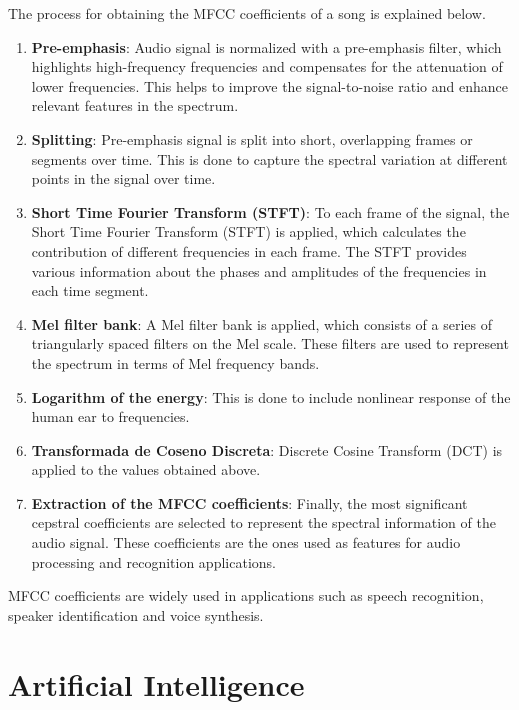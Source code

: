 The process for obtaining the MFCC coefficients of a song is explained below.

\begin{enumerate}
\item \textbf{Pre-emphasis}: Audio signal is normalized with a pre-emphasis filter, which highlights high-frequency frequencies and compensates for the attenuation of lower frequencies. This helps to improve the signal-to-noise ratio and enhance relevant features in the spectrum.

\item \textbf{Splitting}: Pre-emphasis signal is split into short, overlapping frames or segments over time. This is done to capture the spectral variation at different points in the signal over time.

\item \textbf{Short Time Fourier Transform (STFT)}: To each frame of the signal, the Short Time Fourier Transform (STFT) is applied, which calculates the contribution of different frequencies in each frame. The STFT provides various information about the phases and amplitudes of the frequencies in each time segment.

\item \textbf{Mel filter bank}: A Mel filter bank is applied, which consists of a series of triangularly spaced filters on the Mel scale. These filters are used to represent the spectrum in terms of Mel frequency bands.

\item \textbf{Logarithm of the energy}: This is done to include nonlinear response of the human ear to frequencies.

\item \textbf{Transformada de Coseno Discreta}: Discrete Cosine Transform (DCT) is applied to the values obtained above.

\item \textbf{Extraction of the MFCC coefficients}: Finally, the most significant cepstral coefficients are selected to represent the spectral information of the audio signal. These coefficients are the ones used as features for audio processing and recognition applications.
\end{enumerate}

MFCC coefficients are widely used in applications such as speech recognition, speaker identification and voice synthesis.


\section{Artificial Intelligence}

